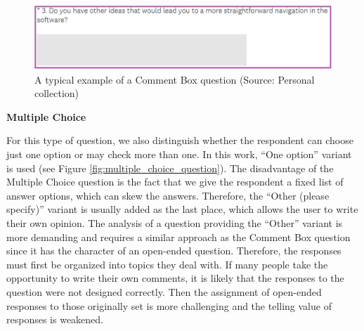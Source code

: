 \documentclass[a4paper,10pt,twoside]{article}
\begin{document}
\vspace{0.3cm}
\begin{figure}[hbt!] 
\begin{center}
\includegraphics[width=15cm]{../pictures/comment_box_question.png} 
\caption[A typical example of a Comment Box question]{A typical example of a Comment Box question (Source: Personal collection)}
\label{fig:comment_box_question}
\end{center}
\end{figure}

\newpage
\vspace*{-1cm}
\bigskip
\noindent \textbf {Multiple Choice}

\noindent For this type of question, we also distinguish whether the
respondent can choose just one option or may check more than one. In
this work, ``One option'' variant is used (see Figure
\ref{fig:multiple_choice_question}). The disadvantage of the Multiple
Choice question is the fact that we give the respondent a fixed list
of answer options, which can skew the answers. Therefore, the ``Other
(please specify)'' variant is usually added as the last place, which
allows the user to write their own opinion. The analysis of a question
providing the ``Other'' variant is more demanding and requires a
similar approach as the Comment Box question since it has the
character of an open-ended question. Therefore, the responses must
first be organized into topics they deal with. If many people take the
opportunity to write their own comments, it is likely that the
responses to the question were not designed correctly. Then the
assignment of open-ended responses to those originally set is more
challenging and the telling value of responses is weakened.
\end{document}
